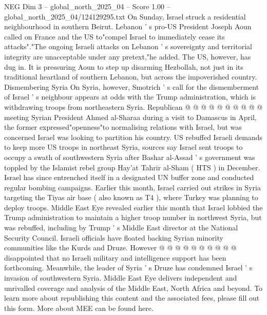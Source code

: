 \begin{textsample}{NEG Dim 3 – global\_north\_2025\_04 – Score 1.00 – global\_north\_2025\_04/124129295.txt}
On Sunday, Israel struck a residential neighbourhood in southern Beirut.
Lebanon ' s pro-US President Joseph Aoun called on France and the US to"compel Israel to immediately cease its attacks"."The ongoing Israeli attacks on Lebanon ' s sovereignty and territorial integrity are unacceptable under any pretext,"he added.
The US, however, has dug in.
It is pressuring Aoun to step up disarming Hezbollah, not just in its traditional heartland of southern Lebanon, but across the impoverished country.
Dismembering Syria On Syria, however, Smotrich ' s call for the dismemberment of Israel ' s neighbour appears at odds with the Trump administration, which is withdrawing troops from northeastern Syria.
Republican @ @ @ @ @ @ @ @ @ @ meeting Syrian President Ahmed al-Sharaa during a visit to Damascus in April, the former expressed"openness"to normalising relations with Israel, but was concerned Israel was looking to partition his country.
US rebuffed Israeli demands to keep more US troops in northeast Syria, sources say Israel sent troops to occupy a swath of southwestern Syria after Bashar al-Assad ' s government was toppled by the Islamist rebel group Hay'at Tahrir al-Sham ( HTS ) in December.
Israel has since entrenched itself in a designated UN buffer zone and conducted regular bombing campaigns.
Earlier this month, Israel carried out strikes in Syria targeting the Tiyas air base ( also known as T4 ), where Turkey was planning to deploy troops.
Middle East Eye revealed earlier this month that Israel lobbied the Trump administration to maintain a higher troop number in northwest Syria, but was rebuffed, including by Trump ' s Middle East director at the National Security Council.
Israeli officials have floated backing Syrian minority communities like the Kurds and Druze.
However @ @ @ @ @ @ @ @ @ @ disappointed that no Israeli military and intelligence support has been forthcoming.
Meanwhile, the leader of Syria ' s Druze has condemned Israel ' s invasion of southwestern Syria.
Middle East Eye delivers independent and unrivalled coverage and analysis of the Middle East, North Africa and beyond.
To learn more about republishing this content and the associated fees, please fill out this form.
More about MEE can be found here.

\end{textsample}
